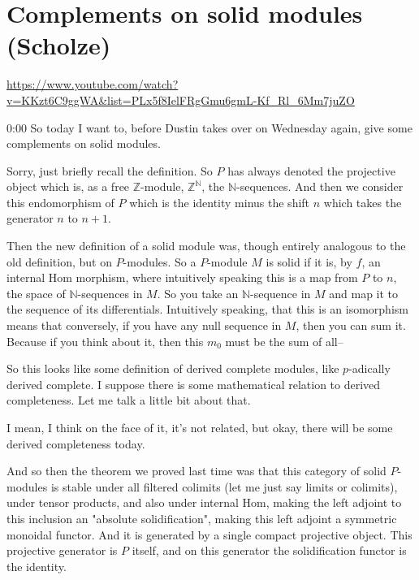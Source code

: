 
\section{\ufs Complements on solid modules (Scholze)}

\url{https://www.youtube.com/watch?v=KKzt6C9ggWA&list=PLx5f8IelFRgGmu6gmL-Kf_Rl_6Mm7juZO}
\renewcommand{\yt}[2]{\href{https://www.youtube.com/watch?v=KKzt6C9ggWA&list=PLx5f8IelFRgGmu6gmL-Kf_Rl_6Mm7juZO&t=#1}{#2}}
\vspace{1em}

\begin{unfinished}{0:00}
So today I want to, before Dustin takes over on Wednesday again, give some complements on solid modules.

Sorry, just briefly recall the definition. So $P$ has always denoted the projective object which is, as a free $\mathbb{Z}$-module, $\mathbb{Z}^{\mathbb{N}}$, the $\mathbb{N}$-sequences. And then we consider this endomorphism of $P$ which is the identity minus the shift $n$ which takes the generator $n$ to $n+1$.

Then the new definition of a solid module was, though entirely analogous to the old definition, but on $P$-modules. So a $P$-module $M$ is solid if it is, by $f$, an internal $\mathrm{Hom}$ morphism, where intuitively speaking this is a map from $P$ to $n$, the space of $\mathbb{N}$-sequences in $M$. So you take an $\mathbb{N}$-sequence in $M$ and map it to the sequence of its differentials. Intuitively speaking, that this is an isomorphism means that conversely, if you have any null sequence in $M$, then you can sum it. Because if you think about it, then this $m_0$ must be the sum of all--

So this looks like some definition of derived complete modules, like $p$-adically derived complete. I suppose there is some mathematical relation to derived completeness. Let me talk a little bit about that.

I mean, I think on the face of it, it's not related, but okay, there will be some derived completeness today.

And so then the theorem we proved last time was that this category of solid $P$-modules is stable under all filtered colimits (let me just say limits or colimits), under tensor products, and also under internal $\mathrm{Hom}$, making the left adjoint to this inclusion an "absolute solidification", making this left adjoint a symmetric monoidal functor. And it is generated by a single compact projective object. This projective generator is $P$ itself, and on this generator the solidification functor is the identity.


\end{unfinished}

